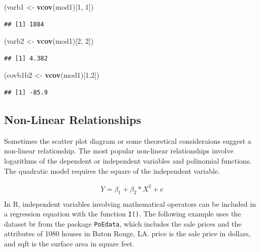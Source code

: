 \documentclass[
]{book}
\newenvironment{Shaded}{\begin{snugshade}}{\end{snugshade}}
\newcommand{\DecValTok}[1]{\textcolor[rgb]{0.00,0.00,0.81}{#1}}
\newcommand{\FunctionTok}[1]{\textcolor[rgb]{0.13,0.29,0.53}{\textbf{#1}}}
\newcommand{\NormalTok}[1]{#1}
\newcommand{\OtherTok}[1]{\textcolor[rgb]{0.56,0.35,0.01}{#1}}
\begin{document}
\begin{Shaded}
\begin{Highlighting}[]
\NormalTok{(varb1 }\OtherTok{\textless{}{-}} \FunctionTok{vcov}\NormalTok{(mod1)[}\DecValTok{1}\NormalTok{, }\DecValTok{1}\NormalTok{])}
\end{Highlighting}
\end{Shaded}

\begin{verbatim}
## [1] 1884
\end{verbatim}

\begin{Shaded}
\begin{Highlighting}[]
\NormalTok{(varb2 }\OtherTok{\textless{}{-}} \FunctionTok{vcov}\NormalTok{(mod1)[}\DecValTok{2}\NormalTok{, }\DecValTok{2}\NormalTok{])}
\end{Highlighting}
\end{Shaded}

\begin{verbatim}
## [1] 4.382
\end{verbatim}

\begin{Shaded}
\begin{Highlighting}[]
\NormalTok{(covb1b2 }\OtherTok{\textless{}{-}} \FunctionTok{vcov}\NormalTok{(mod1)[}\DecValTok{1}\NormalTok{,}\DecValTok{2}\NormalTok{])}
\end{Highlighting}
\end{Shaded}

\begin{verbatim}
## [1] -85.9
\end{verbatim}

\hypertarget{non-linear-relationships}{%
\subsection{Non-Linear Relationships}\label{non-linear-relationships}}

Sometimes the scatter plot diagram or some theoretical consideraions suggest a non-linear relationship. The most popular non-linear relationships involve logarithms of the dependent or independent variables and polinomial functions. The quadratic model requires the square of the independent variable.

\[
\begin{aligned}
Y=\beta_1+\beta_2*X^2+e\\
\end{aligned}
\]
In R, independent variables involving mathematical operators can be included in a regression equation with the function \texttt{I()}. The following example uses the dataset br from the package \texttt{PoEdata}, which includes the sale prices and the attributes of 1080 houses in Baton Rouge, LA. price is the sale price in dollars, and sqft is the surface area in square feet.
\end{document}
